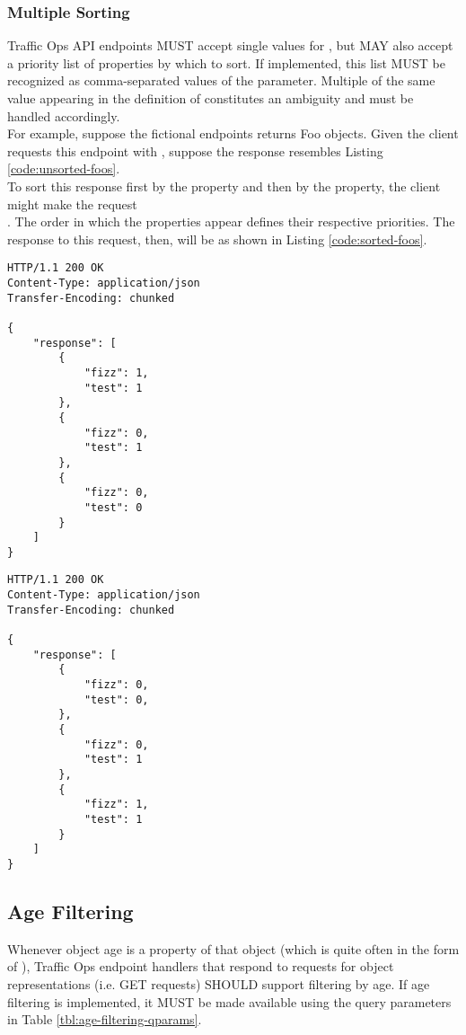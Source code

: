 \subsubsection{Multiple Sorting}
Traffic Ops API endpoints MUST accept single values for , but MAY also accept a priority list of properties by which to sort.
If implemented, this list MUST be recognized as comma-separated values of the  parameter. Multiple of the same value appearing
in the definition of  constitutes an ambiguity and must be handled accordingly.\\
For example, suppose the fictional  endpoints returns Foo objects. Given the client requests this endpoint with
, suppose the response resembles Listing \ref{code:unsorted-foos}.\\
To sort this response first by the  property and then by the  property, the client might make the request\\
. The order in which the properties appear defines their respective
priorities. The response to this request, then, will be as shown in Listing \ref{code:sorted-foos}.

\begin{codelisting}
\label{code:unsorted-foos}
\begin{verbatim}
HTTP/1.1 200 OK
Content-Type: application/json
Transfer-Encoding: chunked

{
	"response": [
		{
			"fizz": 1,
			"test": 1
		},
		{
			"fizz": 0,
			"test": 1
		},
		{
			"fizz": 0,
			"test": 0
		}
	]
}
\end{verbatim}
\end{codelisting}

\newpage{}

\begin{codelisting}
\label{code:sorted-foos}
\begin{verbatim}
HTTP/1.1 200 OK
Content-Type: application/json
Transfer-Encoding: chunked

{
	"response": [
		{
			"fizz": 0,
			"test": 0,
		},
		{
			"fizz": 0,
			"test": 1
		},
		{
			"fizz": 1,
			"test": 1
		}
	]
}
\end{verbatim}
\end{codelisting}

\subsection{Age Filtering}
Whenever object age is a property of that object (which is quite often in the form of ), Traffic Ops endpoint
handlers that respond to requests for object representations (i.e. GET requests) SHOULD support filtering by age. If age filtering
is implemented, it MUST be made available using the query parameters in Table \ref{tbl:age-filtering-qparams}.


